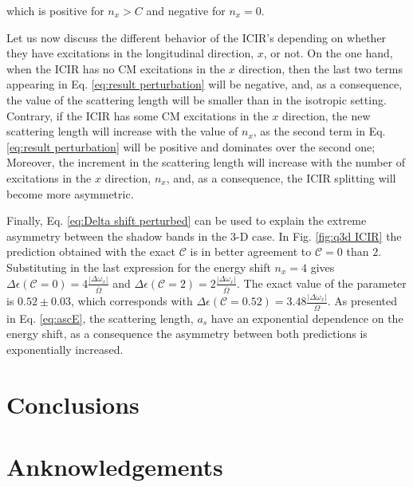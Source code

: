 \documentclass[aps,pre,twocolumn,superscriptaddress,showpacs]{revtex4-1}
\begin{document}
which is positive for $n_x > C$ and negative for $n_x=0$. 

Let us now discuss the different behavior of the ICIR's depending on whether they have excitations in the longitudinal direction, $x$, or not. On the one hand, when the ICIR has no CM excitations in the $x$ direction, then the last two terms appearing in Eq. \ref{eq:result perturbation} will be negative, and, as a consequence, the value of the scattering length will be smaller than in the isotropic setting. Contrary, if the ICIR has some CM excitations in the $x$ direction, the new scattering length will increase with the value of $n_x$, as the second term in Eq. \ref{eq:result perturbation} will be positive and dominates over the second one; Moreover, the increment in the scattering length will increase with the number of excitations in the $x$ direction, $n_x$, and, as a consequence, the ICIR splitting will become more asymmetric.

Finally, Eq. \ref{eq:Delta shift perturbed} can be used to explain the extreme asymmetry between the shadow bands in the 3-D case. In Fig. \ref{fig:q3d ICIR} the prediction obtained with the exact $\mathcal{C}$ is in better agreement to $\mathcal{C}=0$ than $2$. Substituting in the last expression for the energy shift $n_x = 4$ gives $\Delta \epsilon(\mathcal{C}=0) = 4\frac{|\Delta \omega_x|}{\bar{\Omega}}$ and $\Delta \epsilon(\mathcal{C}=2) = 2\frac{|\Delta \omega_x|}{\bar{\Omega}}$. The exact value of the parameter is $0.52 \pm 0.03$, which corresponds with $\Delta \epsilon(\mathcal{C}=0.52) = 3.48\frac{|\Delta \omega_x|}{\bar{\Omega}}$. As presented in Eq. \eqref{eq:ascE}, the scattering length, $a_s$ have an exponential dependence on the energy shift, as a consequence the asymmetry between both predictions is exponentially increased.

\newpage
\section{Conclusions}
\section*{Anknowledgements}



\end{document}
